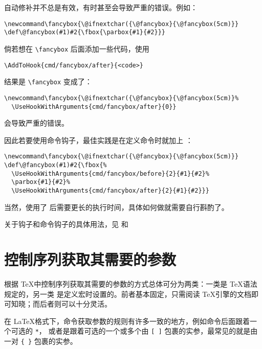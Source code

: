 \documentclass[openany]{book}
\begin{document}
自动修补并不总是有效，有时甚至会导致严重的错误。例如：
\begin{Verbatim}
\newcommand\fancybox{\@ifnextchar({\@fancybox}{\@fancybox(5cm)}}
\def\@fancybox(#1)#2{\fbox{\parbox{#1}{#2}}}
\end{Verbatim}
倘若想在 \verb|\fancybox| 后面添加一些代码，使用
\begin{Verbatim}
\AddToHook{cmd/fancybox/after}{<code>}
\end{Verbatim}
结果是 \verb|\fancybox| 变成了：
\begin{Verbatim}
\newcommand\fancybox{\@ifnextchar({\@fancybox}{\@fancybox(5cm)}%
  \UseHookWithArguments{cmd/fancybox/after}{0}}
\end{Verbatim}
会导致严重的错误。

因此若要使用命令钩子，最佳实践是在定义命令时就加上 ：
\begin{Verbatim}
\newcommand\fancybox{\@ifnextchar({\@fancybox}{\@fancybox(5cm)}}
\def\@fancybox(#1)#2{\fbox{%
  \UseHookWithArguments{cmd/fancybox/before}{2}{#1}{#2}%
  \parbox{#1}{#2}%
  \UseHookWithArguments{cmd/fancybox/after}{2}{#1}{#2}}}
\end{Verbatim}

当然，使用了  后需要更长的执行时间，具体如何做就需要自行斟酌了。

关于钩子和命令钩子的具体用法，见  和 

\section{控制序列获取其需要的参数}

根据 \TeX 中控制序列获取其需要的参数的方式总体可分为两类：一类是 \TeX 语法规定的，另一类
是定义宏时设置的。前者基本固定，只需阅读 \TeX 引擎的文档即可知晓；而后者则可以十分灵活。

在 \LaTeX 格式下，命令获取参数的规则有许多一致的地方，例如命令后面跟着一个可选的 \verb|*|，
或者是跟着可选的一个或多个由 \verb|[ ]| 包裹的实参，最常见的就是由一对 \verb|{ }| 包裹的实参。
\end{document}
